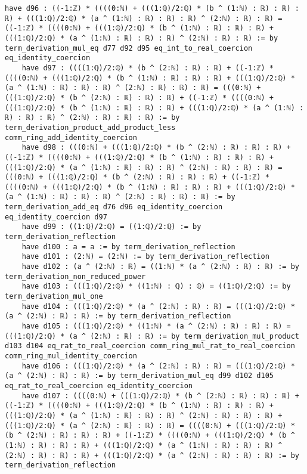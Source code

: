\documentclass{article}
\begin{document}
\begin{tcolorbox}[colback=white!10, width=\linewidth]
\begin{lstlisting}[language=Lean4]
    have d96 : ((-1:ℤ) * ((((0:ℕ) + (((1:ℚ)/2:ℚ) * (b ^ (1:ℕ) : ℝ) : ℝ) : ℝ) + (((1:ℚ)/2:ℚ) * (a ^ (1:ℕ) : ℝ) : ℝ) : ℝ) ^ (2:ℕ) : ℝ) : ℝ) = ((-1:ℤ) * ((((0:ℕ) + (((1:ℚ)/2:ℚ) * (b ^ (1:ℕ) : ℝ) : ℝ) : ℝ) + (((1:ℚ)/2:ℚ) * (a ^ (1:ℕ) : ℝ) : ℝ) : ℝ) ^ (2:ℕ) : ℝ) : ℝ) := by term_derivation_mul_eq d77 d92 d95 eq_int_to_real_coercion eq_identity_coercion
    have d97 : ((((1:ℚ)/2:ℚ) * (b ^ (2:ℕ) : ℝ) : ℝ) + ((-1:ℤ) * ((((0:ℕ) + (((1:ℚ)/2:ℚ) * (b ^ (1:ℕ) : ℝ) : ℝ) : ℝ) + (((1:ℚ)/2:ℚ) * (a ^ (1:ℕ) : ℝ) : ℝ) : ℝ) ^ (2:ℕ) : ℝ) : ℝ) : ℝ) = (((0:ℕ) + (((1:ℚ)/2:ℚ) * (b ^ (2:ℕ) : ℝ) : ℝ) : ℝ) + ((-1:ℤ) * ((((0:ℕ) + (((1:ℚ)/2:ℚ) * (b ^ (1:ℕ) : ℝ) : ℝ) : ℝ) + (((1:ℚ)/2:ℚ) * (a ^ (1:ℕ) : ℝ) : ℝ) : ℝ) ^ (2:ℕ) : ℝ) : ℝ) : ℝ) := by term_derivation_product_add_product_less comm_ring_add_identity_coercion
    have d98 : (((0:ℕ) + (((1:ℚ)/2:ℚ) * (b ^ (2:ℕ) : ℝ) : ℝ) : ℝ) + ((-1:ℤ) * ((((0:ℕ) + (((1:ℚ)/2:ℚ) * (b ^ (1:ℕ) : ℝ) : ℝ) : ℝ) + (((1:ℚ)/2:ℚ) * (a ^ (1:ℕ) : ℝ) : ℝ) : ℝ) ^ (2:ℕ) : ℝ) : ℝ) : ℝ) = (((0:ℕ) + (((1:ℚ)/2:ℚ) * (b ^ (2:ℕ) : ℝ) : ℝ) : ℝ) + ((-1:ℤ) * ((((0:ℕ) + (((1:ℚ)/2:ℚ) * (b ^ (1:ℕ) : ℝ) : ℝ) : ℝ) + (((1:ℚ)/2:ℚ) * (a ^ (1:ℕ) : ℝ) : ℝ) : ℝ) ^ (2:ℕ) : ℝ) : ℝ) : ℝ) := by term_derivation_add_eq d76 d96 eq_identity_coercion eq_identity_coercion d97
    have d99 : ((1:ℚ)/2:ℚ) = ((1:ℚ)/2:ℚ) := by term_derivation_reflection
    have d100 : a = a := by term_derivation_reflection
    have d101 : (2:ℕ) = (2:ℕ) := by term_derivation_reflection
    have d102 : (a ^ (2:ℕ) : ℝ) = ((1:ℕ) * (a ^ (2:ℕ) : ℝ) : ℝ) := by term_derivation_non_reduced_power
    have d103 : (((1:ℚ)/2:ℚ) * ((1:ℕ) : ℚ) : ℚ) = ((1:ℚ)/2:ℚ) := by term_derivation_mul_one
    have d104 : (((1:ℚ)/2:ℚ) * (a ^ (2:ℕ) : ℝ) : ℝ) = (((1:ℚ)/2:ℚ) * (a ^ (2:ℕ) : ℝ) : ℝ) := by term_derivation_reflection
    have d105 : (((1:ℚ)/2:ℚ) * ((1:ℕ) * (a ^ (2:ℕ) : ℝ) : ℝ) : ℝ) = (((1:ℚ)/2:ℚ) * (a ^ (2:ℕ) : ℝ) : ℝ) := by term_derivation_mul_product d103 d104 eq_rat_to_real_coercion comm_ring_mul_rat_to_real_coercion comm_ring_mul_identity_coercion
    have d106 : (((1:ℚ)/2:ℚ) * (a ^ (2:ℕ) : ℝ) : ℝ) = (((1:ℚ)/2:ℚ) * (a ^ (2:ℕ) : ℝ) : ℝ) := by term_derivation_mul_eq d99 d102 d105 eq_rat_to_real_coercion eq_identity_coercion
    have d107 : ((((0:ℕ) + (((1:ℚ)/2:ℚ) * (b ^ (2:ℕ) : ℝ) : ℝ) : ℝ) + ((-1:ℤ) * ((((0:ℕ) + (((1:ℚ)/2:ℚ) * (b ^ (1:ℕ) : ℝ) : ℝ) : ℝ) + (((1:ℚ)/2:ℚ) * (a ^ (1:ℕ) : ℝ) : ℝ) : ℝ) ^ (2:ℕ) : ℝ) : ℝ) : ℝ) + (((1:ℚ)/2:ℚ) * (a ^ (2:ℕ) : ℝ) : ℝ) : ℝ) = ((((0:ℕ) + (((1:ℚ)/2:ℚ) * (b ^ (2:ℕ) : ℝ) : ℝ) : ℝ) + ((-1:ℤ) * ((((0:ℕ) + (((1:ℚ)/2:ℚ) * (b ^ (1:ℕ) : ℝ) : ℝ) : ℝ) + (((1:ℚ)/2:ℚ) * (a ^ (1:ℕ) : ℝ) : ℝ) : ℝ) ^ (2:ℕ) : ℝ) : ℝ) : ℝ) + (((1:ℚ)/2:ℚ) * (a ^ (2:ℕ) : ℝ) : ℝ) : ℝ) := by term_derivation_reflection

\end{lstlisting}
\end{tcolorbox}
\end{document}
